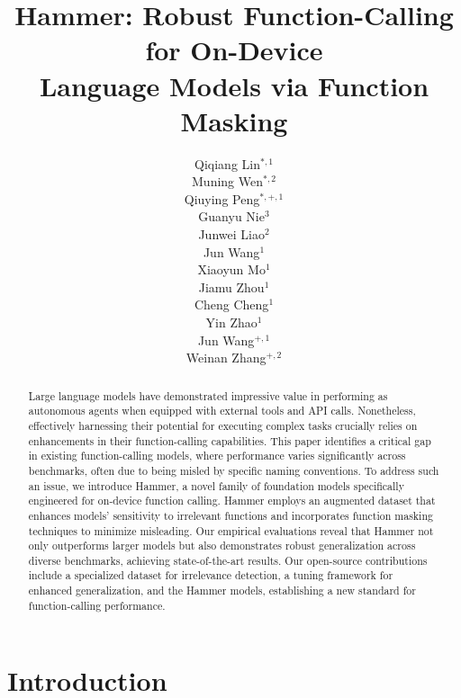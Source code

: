 \documentclass{article}
\title{
Hammer: Robust Function-Calling for On-Device \\ Language Models via Function Masking
}
\author{%
  Qiqiang Lin$^{*,1}$\\
  \And
  Muning Wen$^{*,2}$\\
  \And
  Qiuying Peng$^{*,+,1}$\\
  \And
  Guanyu Nie$^{3}$\\
  \And
  Junwei Liao$^{2}$\\
  \And
  Jun Wang$^{1}$\\
  \And
  Xiaoyun Mo$^{1}$\\
  \And
  Jiamu Zhou$^{1}$\\
  \And
  Cheng Cheng$^{1}$\\
  \And
  Yin Zhao$^{1}$\\
  \And
  Jun Wang$^{+,1}$\\
  \And
  Weinan Zhang$^{+,2}$\\
}
\begin{document}
\maketitle


\let\thefootnote\relax{}

\begin{abstract}
Large language models have demonstrated impressive value in performing as autonomous agents when equipped with external tools and API calls. Nonetheless, effectively harnessing their potential for executing complex tasks crucially relies on enhancements in their function-calling capabilities. This paper identifies a critical gap in existing function-calling models, where performance varies significantly across benchmarks, often due to being misled by specific naming conventions. To address such an issue, we introduce Hammer, a novel family of foundation models specifically engineered for on-device function calling. Hammer employs an augmented dataset that enhances models' sensitivity to irrelevant functions and incorporates function masking techniques to minimize misleading. Our empirical evaluations reveal that Hammer not only outperforms larger models but also demonstrates robust generalization across diverse benchmarks, achieving state-of-the-art results. Our open-source contributions include a specialized dataset for irrelevance detection, a tuning framework for enhanced generalization, and the Hammer models, establishing a new standard for function-calling performance.
\end{abstract}

\section{Introduction}
\end{document}
